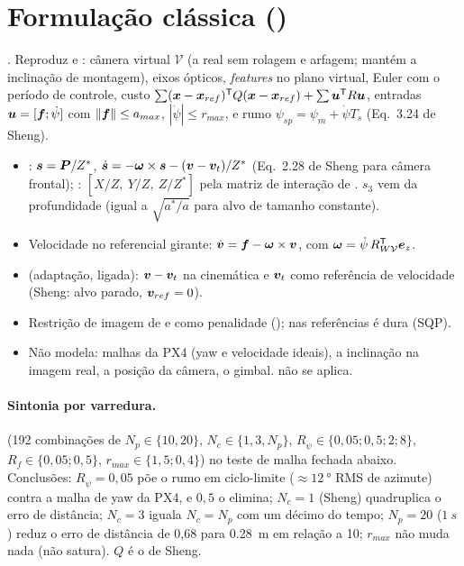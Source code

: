 \section{Formulação clássica ()}
\label{sec:ibvs_classic}
. Reproduz \cite{sheng2019msc} e
\cite{zhang2021rnmpc}: câmera virtual $\mathcal V$ (a real sem rolagem e arfagem; mantém a
inclinação de montagem), eixos ópticos, \emph{features} no plano virtual, Euler com o período de
controle, custo $\sum(\bm{x}-\bm{x}_{ref})^{\mathsf{T}} Q(\bm{x}-\bm{x}_{ref})+\sum\bm{u}^{\mathsf{T}} R\bm{u}$, entradas
$\bm{u}=[\bm{f};\dot\psi]$ com $\|\bm{f}\|\le a_{max}$, $|\dot\psi|\le r_{max}$, e rumo
$\psi_{sp}=\psi_m+\dot\psi T_s$ (Eq.~3.24 de Sheng).
\begin{itemize}
  \item {}: $\bm{s}=\bm{P}/Z^*$, $\dot{\bm{s}}=-\bm{\omega}\times\bm{s}-(\bm{v}-\bm{v}_t)/Z^*$
        (Eq.~2.28 de Sheng para câmera frontal); : $[X/Z,\ Y/Z,\ Z/Z^*]$ pela matriz de
        interação de \cite{chaumette2006}. $s_3$ vem da profundidade (igual a $\sqrt{a^*/a}$ para alvo
        de tamanho constante).
  \item Velocidade no referencial girante: $\dot{\bm{v}}=\bm{f}-\bm{\omega}\times\bm{v}$, com
        $\bm{\omega}=\dot\psi\,R_{W\mathcal V}^{\mathsf{T}}\bm{e}_z$.
  \item {} (adaptação, ligada): $\bm{v}-\bm{v}_t$ na cinemática e $\bm{v}_t$ como
        referência de velocidade (Sheng: alvo parado, $\bm{v}_{ref}=0$).
  \item Restrição de imagem de \cite{allibert2010vpc} e \cite{chan_ibvs_mpc} como penalidade
        (); nas referências é dura (SQP).
  \item Não modela: malhas da PX4 (yaw e velocidade ideais), a inclinação na imagem real, a posição
        da câmera, o gimbal.  não se aplica.
\end{itemize}

\paragraph{Sintonia por varredura.}  (192 combinações de
$N_p\in\{10,20\}$, $N_c\in\{1,3,N_p\}$, $R_{\dot\psi}\in\{0{,}05;0{,}5;2;8\}$, $R_f\in\{0{,}05;0{,}5\}$,
$r_{max}\in\{1{,}5;0{,}4\}$) no teste de malha fechada abaixo. Conclusões: $R_{\dot\psi}=0{,}05$ põe o
rumo em ciclo-limite ($\approx\SI{12}{\degree}$ RMS de azimute) contra a malha de yaw da PX4, e
$0{,}5$ o elimina; $N_c=1$ (Sheng) quadruplica o erro de distância; $N_c=3$ iguala $N_c=N_p$ com
um décimo do tempo; $N_p=20$ ($\SI{1}{s}$) reduz o erro de distância de 0,68 para \SI{0,28}{m}
em relação a 10; $r_{max}$ não muda nada (não satura). $Q$ é o de Sheng.

